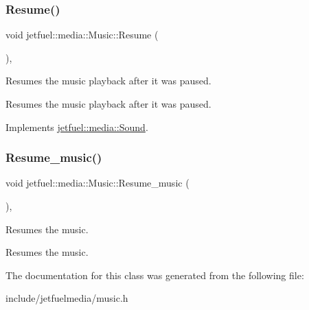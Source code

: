 \subsubsection{\texorpdfstring{Resume()}{Resume()}}
{\footnotesize\ttfamily void jetfuel\+::media\+::\+Music\+::\+Resume (\begin{DoxyParamCaption}{ }\end{DoxyParamCaption})\hspace{0.3cm}{\ttfamily [override]}, {\ttfamily [virtual]}}



Resumes the music playback after it was paused. 

Resumes the music playback after it was paused. 

Implements \hyperlink{classjetfuel_1_1media_1_1Sound_af781fccd8ebb1305e97dc8f6b7c828dc}{jetfuel\+::media\+::\+Sound}.

\mbox{\label{classjetfuel_1_1media_1_1Music_a390925626dcd2531d1b287f0bfb401fd}} 
\subsubsection{\texorpdfstring{Resume\+\_\+music()}{Resume\_music()}}
{\footnotesize\ttfamily void jetfuel\+::media\+::\+Music\+::\+Resume\+\_\+music (\begin{DoxyParamCaption}{ }\end{DoxyParamCaption})\hspace{0.3cm}{\ttfamily [inline]}, {\ttfamily [protected]}}



Resumes the music. 

Resumes the music. 

The documentation for this class was generated from the following file\+:\begin{DoxyCompactItemize}
\item 
include/jetfuelmedia/music.\+h\end{DoxyCompactItemize}
